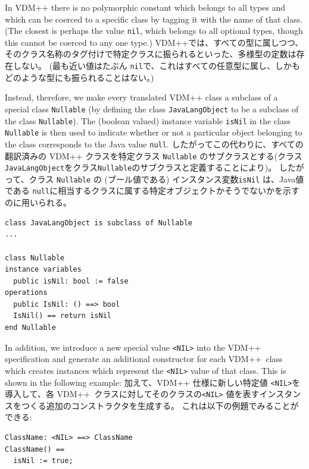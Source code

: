\documentclass[\pformat,12pt]{jarticle}
\newcommand{\VDM}{VDM++}
\begin{document}
In VDM++ there is no polymorphic constant which belongs to all types
and which can be coerced to a specific class by tagging it with the
name of that class. (The closest is perhaps the value \texttt{nil},
which belongs to all optional types, though this cannot be coerced to
any one type.)
VDM++では、すべての型に属しつつ、そのクラス名称のタグ付けで特定クラスに振られるといった、多様型の定数は存在しない。
(最も近い値はたぶん \texttt{nil}で、これはすべての任意型に属し、しかもどのような型にも振られることはない。)

Instead, therefore, we make every translated VDM++ class a
subclass of a special class \texttt{Nullable} (by defining the class
\texttt{JavaLangObject} to be a subclass of the class
\texttt{Nullable}). The (boolean valued) instance variable
\texttt{isNil} in the class \texttt{Nullable} is then used to indicate
whether or not a particular object belonging to the class corresponds
to the Java value \texttt{null}. 
したがってこの代わりに、すべての翻訳済みの VDM++ クラスを特定クラス \texttt{Nullable} のサブクラスとする(クラス\texttt{JavaLangObject}をクラス\texttt{Nullable}のサブクラスと定義することにより)。 
したがって、クラス \texttt{Nullable} の (ブール値である) インスタンス変数\texttt{isNil} は、Java値である \texttt{null}に相当するクラスに属する特定オブジェクトかそうでないかを示すのに用いられる。 

\begin{small}
\begin{verbatim}
class JavaLangObject is subclass of Nullable
...

class Nullable
instance variables
  public isNil: bool := false
operations
  public IsNil: () ==> bool
  IsNil() == return isNil
end Nullable
\end{verbatim}
\end{small}

In addition, we introduce a new special value \texttt{<NIL>}
into the VDM++ specification and generate an additional constructor
for each \VDM\ class which creates instances which represent the
\texttt{<NIL>} value of that class. This is shown in the following
example: 
加えて、VDM++ 仕様に新しい特定値 \texttt{<NIL>}を 導入して、各 \VDM\ クラスに対してそのクラスの\texttt{<NIL>} 値を表すインスタンスをつくる追加のコンストラクタを生成する。
これは以下の例題でみることができる: 

\begin{small}
\begin{verbatim}
ClassName: <NIL> ==> ClassName
ClassName() ==
  isNil := true;
\end{verbatim}
\end{small}
\end{document}
